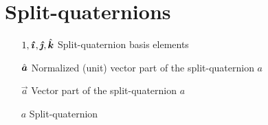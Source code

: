 \section*{Split-quaternions}
\begin{itemize}[itemsep=0pt, leftmargin=2cm, labelsep=0cm, labelwidth=1.9cm, align=left]
%
    \item[$1,\quati,\quatj,\quatk$] Split-quaternion basis elements
    \item[$\uvec{a}$] Normalized (unit) vector part of the split-quaternion $a$
    \item[$\vec{a}$] Vector part of the split-quaternion $a$
    \item[$a$] Split-quaternion
%
%
%
\end{itemize}